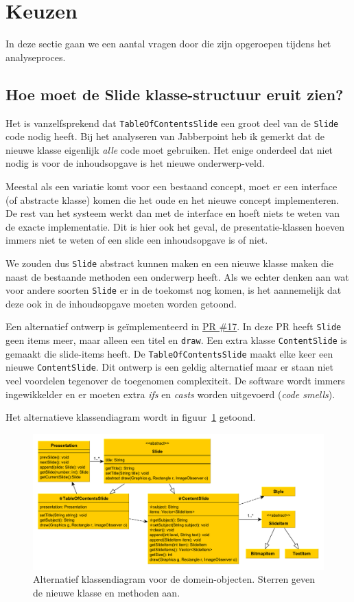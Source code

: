 \documentclass[a4paper]{article}
\newcommand{\question}[1]{
  \subsection{#1}
}
\newcommand{\code}[1]{\lstinline[columns=fixed]{#1}}
\begin{document}
\section{Keuzen}\label{sec:keuzen}
    In deze sectie gaan we een aantal vragen door die zijn opgeroepen tijdens het analyseproces.
    
    \question{Hoe moet de Slide klasse-structuur eruit zien?}
    Het is vanzelfsprekend dat \code{TableOfContentsSlide} een groot deel van de \code{Slide} code nodig heeft.
    Bij het analyseren van Jabberpoint heb ik gemerkt dat de nieuwe klasse eigenlijk \textit{alle} code moet gebruiken.
    Het enige onderdeel dat niet nodig is voor de inhoudsopgave is het nieuwe onderwerp-veld.
    
    Meestal als een variatie komt voor een bestaand concept, moet er een interface (of abstracte klasse) komen die het oude en het nieuwe concept implementeren.
    De rest van het systeem werkt dan met de interface en hoeft niets te weten van de exacte implementatie.
    Dit is hier ook het geval, de presentatie-klassen hoeven immers niet te weten of een slide een inhoudsopgave is of niet.
    
    We zouden dus \code{Slide} abstract kunnen maken en een nieuwe klasse maken die naast de bestaande methoden een onderwerp heeft.
    Als we echter denken aan wat voor andere soorten \code{Slide} er in de toekomst nog komen, is het aannemelijk dat deze ook in de inhoudsopgave moeten worden getoond.
    
    Een alternatief ontwerp is geïmplementeerd in \hyperlink{https://github.com/DanielSchiavini/design-patterns-assignment/pull/17}{PR \#17}.
    In deze PR heeft \code{Slide} geen items meer, maar alleen een titel en \code{draw}.
    Een extra klasse \code{Content}\-\code{Slide} is gemaakt die slide-items heeft.
    De \code{TableOfContentsSlide} maakt elke keer een nieuwe \code{ContentSlide}.
    Dit ontwerp is een geldig alternatief maar er staan niet veel voordelen tegenover de toegenomen complexiteit.
    De software wordt immers ingewikkelder en er moeten extra \textit{ifs} en \textit{casts} worden uitgevoerd (\textit{code smells}).

    Het alternatieve klassendiagram wordt in figuur~\ref{fig:design-alternative} getoond.
    \begin{figure}[!htb]
     \caption{
        Alternatief klassendiagram voor de domein-objecten.\label{fig:design-alternative}
        Sterren geven de nieuwe klasse en methoden aan.
     }
     \centering \includegraphics[width=\textwidth]{Diagrams/design-alternative.pdf}
    \end{figure}
\end{document}
